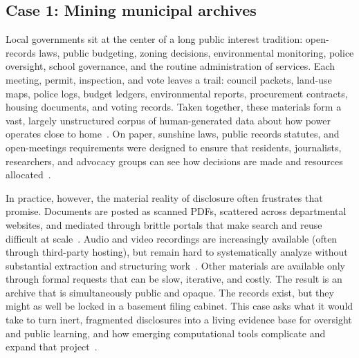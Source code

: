 \documentclass[acmsmall,screen]{acmart}
\begin{document}
\subsection*{Case 1: Mining municipal archives}

Local governments sit at the center of a long public interest tradition: open-records laws, public budgeting, zoning decisions, environmental monitoring, police oversight, school governance, and the routine administration of services. Each meeting, permit, inspection, and vote leaves a trail: council packets, land-use maps, police logs, budget ledgers, environmental reports, procurement contracts, housing documents, and voting records. Taken together, these materials form a vast, largely unstructured corpus of human-generated data about how power operates close to home~\cite{barariLocalViewDatabasePublic2023,sumnerCrowdsourcingReliableLocal2020}. On paper, sunshine laws, public records statutes, and open-meetings requirements were designed to ensure that residents, journalists, researchers, and advocacy groups can see how decisions are made and resources allocated~\cite{einsteinWhoParticipatesLocal2019,yoderDoesPropertyOwnership2020,holmanTablingDebateHow2025}. 

In practice, however, the material reality of disclosure often frustrates that promise. Documents are posted as scanned PDFs, scattered across departmental websites, and mediated through brittle portals that make search and reuse difficult at scale~\cite{brownCouncilDataProject2021,barariLocalViewDatabasePublic2023,fuNaturalLanguageProcessing2024}. Audio and video recordings are increasingly available (often through third-party hosting), but remain hard to systematically analyze without substantial extraction and structuring work~\cite{barariPromiseTextAudio2025a,xuPUBLICSPEAKHearingPublic2025}. Other materials are available only through formal requests that can be slow, iterative, and costly.\cite{warrenRequestAtlasSupportingSlow2025} The result is an archive that is simultaneously public and opaque. The records exist, but they might as well be locked in a basement filing cabinet. This case asks what it would take to turn inert, fragmented disclosures into a living evidence base for oversight and public learning, and how emerging computational tools complicate and expand that project~\cite{spangherTrackingNewsworthinessPublic2024,fuNaturalLanguageProcessing2024}.
\end{document}
